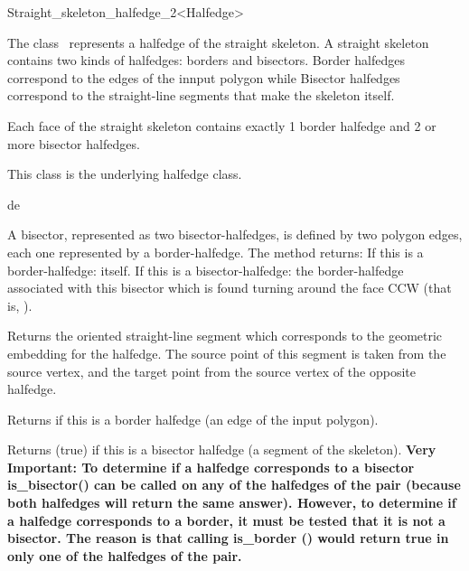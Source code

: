 \begin{ccRefClass} {Straight_skeleton_halfedge_2<Halfedge>}

\ccDefinition

The class \ccClassTemplateName\ represents a halfedge of the straight skeleton.
A straight skeleton contains two kinds of halfedges: borders and bisectors. Border halfedges correspond to the edges of the innput polygon while Bisector halfedges correspond to the straight-line segments that make the skeleton itself.

Each face of the straight skeleton contains exactly 1 border halfedge and 2 or more bisector halfedges.
\ccInheritsFrom


This class is the underlying halfedge class.

\ccTypes

\ccThreeToTwo


\ccCreation
{}

{de}




\ccOperations



{A bisector, represented as two bisector-halfedges, is defined by two polygon edges, each one represented by a border-halfedge.
The method returns:
If this is a border-halfedge: itself.
If this is a bisector-halfedge: the border-halfedge associated with this bisector which is found turning around the face CCW (that is, ). }

{Returns the oriented straight-line segment which corresponds to the geometric embedding for the halfedge. The source point of this segment is taken from the source vertex, and the target point from the source vertex of the opposite halfedge.}

{Returns  if this is a border halfedge (an edge of the input polygon).}

{Returns \ccc(true) if this is a bisector halfedge (a segment of the skeleton).
\textbf{Very Important: To determine if a halfedge corresponds to a bisector is\_bisector() can be called on any of the halfedges of the pair (because both halfedges will return the same answer). However, to determine if a halfedge corresponds to a border, it must be tested that it is not a bisector. The reason is that calling is\_border () would return true in only one of the halfedges of the pair.}} 
\end{ccRefClass}

